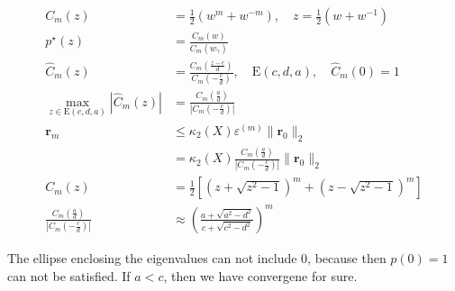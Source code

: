 \begin{align*}
    C_m(z)                                        & = \frac{1}{2}(w^m + w^{-m}), \quad z = \frac{1}{2}(w + w^{-1})                                    \\
    p^\star(z)                                    & = \frac{C_m(w)}{C_m(w_\gamma)}                                                                    \\
    \hat{C}_m(z)                                  & = \frac{C_m(\frac{z - c}{d})}{C_m(-\frac{c}{d})}, \quad \mathrm{E}(c,d,a), \quad \hat{C}_m(0) = 1 \\
    \max_{z \in \mathrm{E}(c,d,a)} |\hat{C}_m(z)| & = \frac{C_m(\frac{a}{d})}{|C_m(-\frac{c}{d})|}                                                    \\
    \mathbf{r}_m                                  & \leq \kappa_2(X) \varepsilon^{(m)} \|\mathbf{r}_0\|_2                                             \\
                                                  & = \kappa_2(X) \frac{C_m(\frac{a}{d})}{|C_m(-\frac{c}{d})|} \|\mathbf{r}_0\|_2                     \\
    C_m(z)                                        & = \frac{1}{2}\left[\left(z + \sqrt{z^2 - 1}\right)^m + \left(z - \sqrt{z^2 - 1}\right)^m\right]   \\
    \frac{C_m(\frac{a}{d})}{|C_m(-\frac{c}{d})|}  & \approx \left(\frac{a + \sqrt{a^2 - d^2}}{c + \sqrt{c^2 - d^2}}\right)^m
\end{align*}

The ellipse enclosing the eigenvalues can not include $0$, because then $p(0) = 1$ can not be satisfied.
If $a < c$, then we have convergene for sure.





